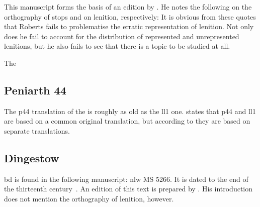 This manuscript forms the basis of an edition
by \textcite{roberts_brut_1971}.  He notes the following on the
orthography of stops and on lenition, respectively:
It is obvious from these quotes that Roberts fails to problematise the
erratic representation of lenition.  Not only does he fail to account
for the distribution of represented and unrepresented lenitions, but
he also fails to see that there is a topic to be studied at all.

The 

\subsection{Peniarth 44}
The \gls{p44} translation of the  is roughly as old as the \gls{ll1} one.
\Textcite{lewis_brut_1942} states that \gls{p44} and \gls{ll1} are based on a common original translation,
but according to \textcite[xliii--xliv]{roberts_astudiaeth_1969}  they are based on separate translations.


\subsection{Dingestow}
\label{sec:dingestow}
\Gls{bd} is found in the following manuscript: \gls{nlw} MS 5266.  It
is dated to the end of the thirteenth century~\autocite[xliii]{roberts_astudiaeth_1969}.
An edition of this text is prepared by \textcite{lewis_brut_1942}.  His
introduction does not mention the orthography of lenition, however.

